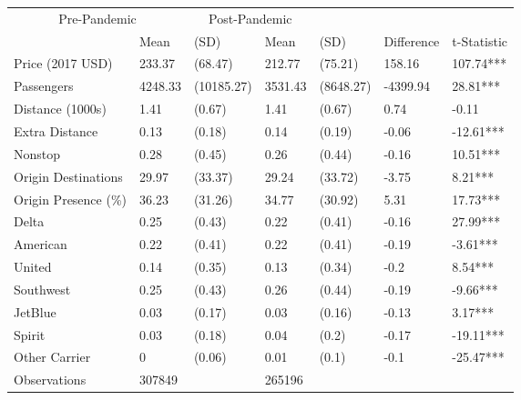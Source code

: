 
\begin{tabular}[t]{lllllll}
\toprule
\multicolumn{2}{c}{Pre-Pandemic} & \multicolumn{2}{c}{Post-Pandemic} & \multicolumn{2}{c}{ } \\
\cmidrule(l{3pt}r{3pt}){1-2} \cmidrule(l{3pt}r{3pt}){3-4}
 & Mean & (SD) & Mean & (SD) & Difference & t-Statistic\\
\midrule
Price (2017 USD) & 233.37 & (68.47) & 212.77 & (75.21) & 158.16 & 107.74***\\
Passengers & 4248.33 & (10185.27) & 3531.43 & (8648.27) & -4399.94 & 28.81***\\
Distance (1000s) & 1.41 & (0.67) & 1.41 & (0.67) & 0.74 & -0.11\\
Extra Distance & 0.13 & (0.18) & 0.14 & (0.19) & -0.06 & -12.61***\\
Nonstop & 0.28 & (0.45) & 0.26 & (0.44) & -0.16 & 10.51***\\
\addlinespace
Origin Destinations & 29.97 & (33.37) & 29.24 & (33.72) & -3.75 & 8.21***\\
Origin Presence (\%) & 36.23 & (31.26) & 34.77 & (30.92) & 5.31 & 17.73***\\
Delta & 0.25 & (0.43) & 0.22 & (0.41) & -0.16 & 27.99***\\
American & 0.22 & (0.41) & 0.22 & (0.41) & -0.19 & -3.61***\\
United & 0.14 & (0.35) & 0.13 & (0.34) & -0.2 & 8.54***\\
\addlinespace
Southwest & 0.25 & (0.43) & 0.26 & (0.44) & -0.19 & -9.66***\\
JetBlue & 0.03 & (0.17) & 0.03 & (0.16) & -0.13 & 3.17***\\
Spirit & 0.03 & (0.18) & 0.04 & (0.2) & -0.17 & -19.11***\\
Other Carrier & 0 & (0.06) & 0.01 & (0.1) & -0.1 & -25.47***\\
Observations & 307849 &  & 265196 &  &  & \\
\bottomrule
\end{tabular}
